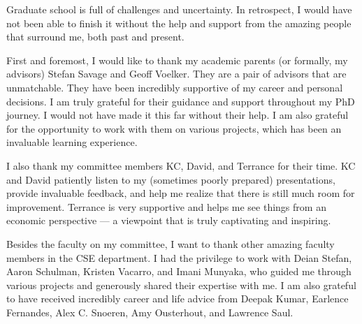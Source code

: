 \documentclass[12pt]{ucsddissertation}
\begin{document}
\begin{acknowledgements}
Graduate school is full of challenges and uncertainty. In retrospect, I would have not been able to finish it without the help and support from the amazing people that surround me, both past and present.

First and foremost, I would like to thank my academic parents (or formally, my advisors) Stefan Savage and Geoff Voelker. They are a pair of advisors that are unmatchable. They have been incredibly supportive of my career and personal decisions. I am truly grateful for their guidance and support throughout my PhD journey. I would not have made it this far without their help. I am also grateful for the opportunity to work with them on various projects, which has been an invaluable learning experience. %

I also thank my committee members KC, David, and Terrance for their time. KC and David patiently listen to my (sometimes poorly prepared) presentations, provide invaluable feedback, and help me realize that there is still much room for improvement. Terrance is very supportive and helps me see things from an economic perspective --- a viewpoint that is truly captivating and inspiring.

Besides the faculty on my committee, I want to thank other amazing faculty members in the CSE  department. I had the privilege to work with Deian Stefan, Aaron Schulman, Kristen Vacarro, and Imani Munyaka, who 
guided me through various projects and generously shared their expertise with me. I am also grateful to have received incredibly career and life advice from Deepak Kumar, Earlence Fernandes, Alex C. Snoeren, Amy Ousterhout, and Lawrence Saul.


\end{acknowledgements}
\end{document}
